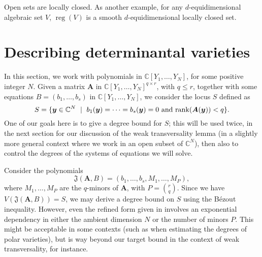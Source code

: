 \documentclass[12pt]{article}
\def\X{S}
\def\frkJ{\mathfrak{J}}
\def\yb{{\bm y}}
\DeclareMathOperator{\reg}{reg}
\def\C{\mathbb{C}}
\begin{document}
Open sets are locally closed. As another example, for any
$d$-equidimensional algebraic set $V$, $\reg(V)$ is a smooth
$d$-equidimensional locally closed set.


\section{Describing determinantal varieties}\label{ssec:detvar}

In this section, we work with polynomials in $\C[Y_1,\dots,Y_N]$, for
some positive integer $N$. Given a matrix $\bm A$ in
$\C[Y_1,\dots,Y_N]^{q \times r}$, with $q \le r$, together with some
equations $B=(b_1,\dots,b_s)$ in $\C[Y_1,\dots,Y_N]$, we consider the
locus $\X$ defined as 
\[\X = \{\yb \in \C^N \ \mid \ b_1(\yb) = \cdots = b_s(\yb) =0 
     \text{~and~} {\rm rank}(\bm A(\yb)) < q\}.\] One of our goals
     here is to give a degree bound for $\X$; this will be used twice,
     in the next section for our discussion of the weak transversality
     lemma (in a slightly more general context where we work in an
     open subset of $\C^N$), then also to control the degrees of the
     systems of equations we will solve.

Consider the polynomials
\[\frkJ(\bm A, B) = (b_1,\dots,b_s,M_1,\dots,M_P),\]
where $M_1,\dots,M_P$ are the $q$-minors of $\bm A$, with $P={r \choose
q}$. Since we have $V(\frkJ(\bm A, B)) = \X$, we may derive a degree
bound on $\X$ using the B\'ezout inequality. However, even the refined
form given in \cite[Proposition 2.3]{Heintz1980} involves an
exponential dependency in either the ambient dimension $N$ or the
number of minors $P$. This might be acceptable in some contexts (such
as when estimating the degrees of polar varieties), but is way beyond
our target bound in the context of weak transversality, for instance.
\end{document}
